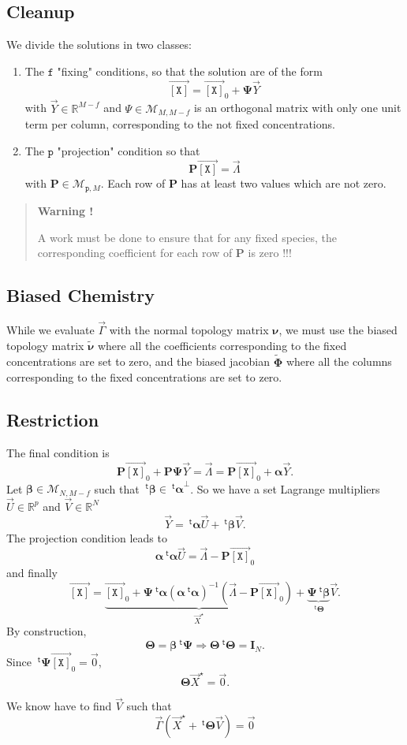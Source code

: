 \documentclass[aps,twocolumn]{revtex4}
\newcommand{\myconc}[1]{\left\lbrack #1 \right\rbrack}
\newcommand{\mychem}[1]{{\mathtt{#1}}}
\newcommand{\mymat}[1]{\boldsymbol{#1}}
\newcommand{\mytrn}[1]{{\!\!~^{\mathsf{t}}{#1}}}
\newcommand{\myvec}[1]{\overrightarrow{#1}}
\newcommand{\vecX}{\myvec{\myconc{\mychem{X}}}}
\newcommand{\fixed}{\mathtt{f}}
\newcommand{\proj}{\mathtt{p}}
\begin{document}
\subsection{Cleanup}
We divide the solutions in two classes:
\begin{enumerate}
	\item The $\fixed$ "fixing" conditions, so that the solution are of the form
	$$
		\vecX = \vecX_0 + \mymat{\Psi} \vec{Y}
	$$
	with $\vec{Y}\in\mathbb{R}^{M-f}$ and $\Psi\in\mathcal{M}_{M,M-f}$ is an orthogonal matrix with only one
	unit term per column, corresponding to the not fixed concentrations.

	\item The $\proj$ "projection" condition so that
	$$
		\mymat{P}\vecX = \myvec{\Lambda}	
	$$
	with $\mymat{P}\in\mathcal{M}_{\proj,M}$.
	 Each row of $\mymat{P}$ has at least two 
	values which are not zero.
\end{enumerate}

\begin{quote}
\centerline{\textbf{Warning !}}
A work must be done to ensure that for any fixed species, the corresponding coefficient for
each row of $\mymat{P}$  is zero !!!
\end{quote}

\subsection{Biased Chemistry}
While we evaluate $\vec{\Gamma}$ with the normal topology matrix $\mymat{\nu}$, we must use
the biased topology matrix $\tilde{\mymat{\nu}}$ where all the coefficients corresponding to the
fixed concentrations are set to zero, and the biased jacobian $\tilde{\mymat{\Phi}}$ where
all the columns corresponding to the fixed concentrations are set to zero.

\subsection{Restriction}
The final condition is
$$
	\mymat{P}\vecX_0 + \mymat{P}\mymat{\Psi} \vec{Y} = \vec{\Lambda} = \mymat{P}\vecX_0 + \mymat{\alpha} \vec{Y}.
$$
Let $\mymat{\beta}\in\mathcal{M}_{N,M-f}$ such that $\mytrn{\mymat{\beta}} \in \mytrn{\mymat{\alpha}}^\perp$.
So we have a set Lagrange multipliers $\vec{U}\in\mathbb{R}^{p}$ and $\vec{V}\in\mathbb{R}^{N}$
$$
	\vec{Y} = \mytrn{\mymat{\alpha}}\vec{U} + \mytrn{\mymat{\beta}}\vec{V}.
$$
The projection condition leads to
$$
	\mymat{\alpha}\mytrn{\mymat{\alpha}}\vec{U} = \vec{\Lambda} - \mymat{P}\vecX_0
$$
and finally
$$
	\vecX = \underbrace{\vecX_0 + \mymat{\Psi} \mytrn{\mymat{\alpha}}\left(\mymat{\alpha}\mytrn{\mymat{\alpha}}\right)^{-1}\left(\vec{\Lambda} - \mymat{P}\vecX_0\right)}_{\vec{X}^\star}
	+\underbrace{\mymat{\Psi}\mytrn{\mymat{\beta}}}_{\mytrn{\mymat{\Theta}}}\vec{V}.
$$
By construction,
$$
	\mymat{\Theta} = \mymat{\beta}\mytrn{\mymat{\Psi}} \Rightarrow \mymat{\Theta}\mytrn{\mymat{\Theta}} = \mymat{I}_N.
$$
Since $\mytrn{\mymat{\Psi}}\vecX_0 = \vec{0}$, 
$$
		\mymat{\Theta} \vec{X}^\star = \vec{0}.
$$

We know have to find $\vec{V}$ such that
$$
	\vec{\Gamma}(\vec{X}^\star + \mytrn{\mymat{\Theta}}\vec{V}) = \vec{0}
$$
\end{document}
